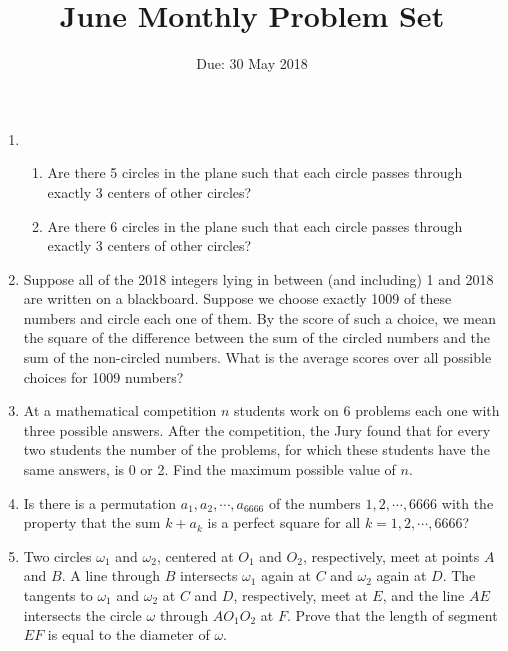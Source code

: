 \documentclass[11pt]{article}
\title{June Monthly Problem Set}
\author{Due: 30 May 2018}
\date{\vspace{-24pt}}
\begin{document}
 \vspace{-12pt} \maketitle \pagestyle{empty}

\begin{enumerate}

\item %
\begin{enumerate}
  \item Are there 5 circles in the plane such that each circle passes through exactly 3 centers of other circles?
  \item Are there 6 circles in the plane such that each circle passes through exactly 3 centers of other circles?
\end{enumerate}


\item %
Suppose all of the 2018 integers lying in between (and including) 1 and 2018 are written on a blackboard. Suppose we choose exactly 1009 of these numbers and circle each one of them. By the score of such a choice, we mean the square of the difference between the sum of the circled numbers and the sum of the non-circled numbers. What is the average scores over all possible choices for 1009 numbers?


\item %
At a mathematical competition $n$ students work on 6 problems each one with three possible answers. After the competition, the Jury found that for every two students the number of the problems, for which these students have the same answers, is 0 or 2. Find the maximum possible value of $n$.


\item %
Is there is a permutation $a_1,a_2,\cdots,a_{6666}$ of the numbers $1,2,\cdots,6666$ with the property that the sum $k+a_k$ is a perfect square for all $k=1,2,\cdots,6666$?


\item %
Two circles $\omega_1$ and $\omega_2$, centered at $O_1$ and $O_2$, respectively, meet at points $A$ and $B$. A line through $B$ intersects $\omega_1$ again at $C$ and $\omega_2$ again at $D$. The tangents to $\omega_1$ and $\omega_2$ at $C$ and $D$, respectively, meet at $E$, and the line $AE$ intersects the circle $\omega$ through $AO_1O_2$ at $F$. Prove that the length of segment $EF$ is equal to the diameter of $\omega$.



\end{enumerate}
\end{document}
